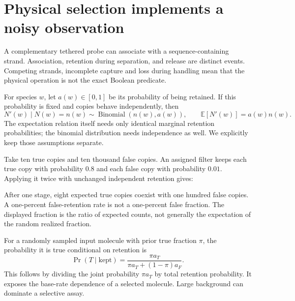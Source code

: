 \section{Physical selection implements a noisy observation}
A complementary tethered probe can associate with a sequence-containing
strand. Association, retention during separation, and release are distinct
events. Competing strands, incomplete capture and loss during handling mean
that the physical operation is not the exact Boolean predicate.

For species $w$, let $a(w)\in[0,1]$ be its probability of being retained.
If this probability is fixed and copies behave independently, then
\begin{equation}
 N'(w)\mid N(w)=n(w)\sim\operatorname{Binomial}(n(w),a(w)),\qquad
 \mathbb E[N'(w)]=a(w)n(w).
\end{equation}
The expectation relation itself needs only identical marginal retention
probabilities; the binomial distribution needs independence as well.
We explicitly keep those assumptions separate.

Take ten true copies and ten thousand false copies. An assigned filter keeps
each true copy with probability $0.8$ and each false copy with probability
$0.01$. Applying it twice with unchanged independent retention gives:
\begin{center}\end{center}
After one stage, eight expected true copies coexist with one hundred false
copies. A one-percent false-retention rate is not a one-percent false fraction.
The displayed fraction is the ratio of expected counts, not generally the
expectation of the random realized fraction.

For a randomly sampled input molecule with prior true fraction $\pi$,
the probability it is true conditional on retention is
\begin{equation}
 \Pr(T\mid\mathrm{kept})=
 \frac{\pi a_T}{\pi a_T+(1-\pi)a_F}.
\end{equation}
This follows by dividing the joint probability $\pi a_T$ by total retention
probability. It exposes the base-rate dependence of a selected molecule.
Large background can dominate a selective assay.

